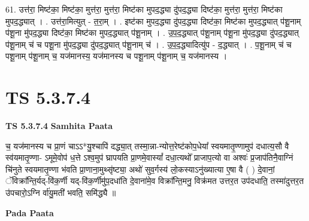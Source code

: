 \documentclass[17pt]{extarticle}
\begin{document}
61. उत्त॑रा॒ मिष्ट॑का॒ मिष्ट॑का॒ मुत्त॑रा॒ मुत्त॑रा॒ मिष्ट॑का मुपद॒द्ध्या दु॑पद॒द्ध्या दिष्ट॑का॒ मुत्त॑रा॒ मुत्त॑रा॒ मिष्ट॑का मुपद॒द्ध्यात् । . उत्त॑रा॒मित्युत् - त॒रा॒म् । . इष्ट॑का मुपद॒द्ध्या दु॑पद॒द्ध्या दिष्ट॑का॒ मिष्ट॑का मुपद॒द्ध्यात् प॑शू॒नाम् प॑शू॒ना मु॑पद॒द्ध्या दिष्ट॑का॒ मिष्ट॑का मुपद॒द्ध्यात् प॑शू॒नाम् । . उ॒प॒द॒द्ध्यात् प॑शू॒नाम् प॑शू॒ना मु॑पद॒द्ध्या दु॑पद॒द्ध्यात् प॑शू॒नाम् च॑ च पशू॒ना मु॑पद॒द्ध्या दु॑पद॒द्ध्यात् प॑शू॒नाम् च॑ । . उ॒प॒द॒द्ध्यादित्यु॑प - द॒द्ध्यात् । . प॒शू॒नाम् च॑ च पशू॒नाम् प॑शू॒नाम् च॒ यज॑मानस्य॒ यज॑मानस्य च पशू॒नाम् प॑शू॒नाम् च॒ यज॑मानस्य । \newline
\pagebreak
{}

\section{ TS 5.3.7.4 }

\textbf{TS 5.3.7.4 } \newline
\textbf{Samhita Paata} \newline

च॒ यज॑मानस्य च प्रा॒णं चाऽऽ*यु॒श्चापि॑ दद्ध्या॒त् तस्मा॒न्ना-न्योत्त॒रेष्ट॑कोप॒धेया᳚ स्वयमातृ॒ण्णामुप॑ दधात्य॒सौ वै स्व॑यमातृ॒ण्णा- ऽमूमे॒वोप॑ ध॒त्ते ऽश्व॒मुप॑ घ्रापयति प्रा॒णमे॒वास्यां᳚ दधा॒त्यथो᳚ प्राजाप॒त्यो वा अश्वः॑ प्र॒जाप॑तिनै॒वाग्निं चि॑नुते स्वयमातृ॒ण्णा भ॑वति प्रा॒णाना॒मुथ्सृ॑ष्ट्या॒ अथो॑ सुव॒र्गस्य॑ लो॒कस्याऽनु॑ख्यात्या ए॒षा वै ( ) दे॒वानां॒ ॅविक्रा᳚न्ति॒र्यद्-वि॑क॒र्णी यद्-वि॑क॒र्णीमु॑प॒दधा॑ति दे॒वाना॑मे॒व विक्रा᳚न्ति॒मनु॒ विक्र॑मत उत्तर॒त उप॑दधाति॒ तस्मा॑दुत्तर॒त उ॑पचारो॒ऽग्नि र्वा॑यु॒मती॑ भवति॒ समि॑द्ध्यै ॥ \newline

\textbf{Pada Paata} \newline
\end{document}
